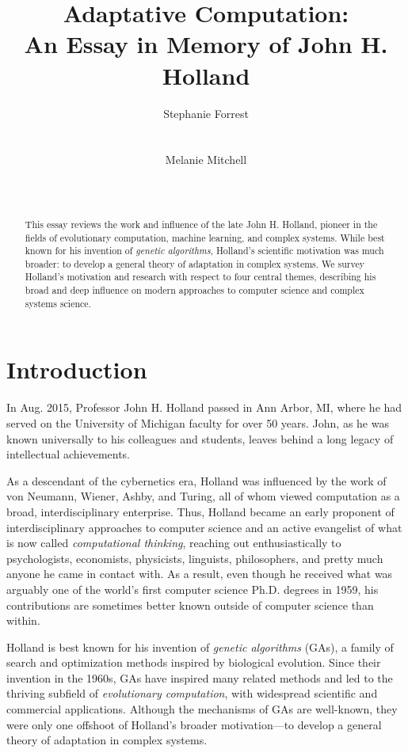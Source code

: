 \documentclass{sig-alternate}
\title{Adaptative Computation:\\ An Essay in Memory of John
  H. Holland}
\author 
{\alignauthor
 Stephanie Forrest\\
 \affaddr{University of New Mexico}\\
 \affaddr{Santa Fe Institute}\\
 \email{forrest@cs.unm.edu}
 \alignauthor
Melanie Mitchell \\
 \affaddr{Portland State University}\\
 \affaddr{Santa Fe Institute}\\
 \email{mm@pdx.edu}
}
\begin{document}
\maketitle

\begin{abstract}
This essay reviews the work and influence of the late John H. Holland,
pioneer in the fields of evolutionary computation, machine learning,
and complex systems.  While best known for his invention of
\emph{genetic algorithms}, Holland's scientific motivation was much
broader:  to develop a general theory of adaptation in complex
systems.  We survey Holland's motivation and research with respect to
four central themes, describing his broad and deep influence on modern approaches to computer science and complex systems science.  
\end{abstract}

\section{Introduction}

In Aug. 2015, Professor John H. Holland passed in Ann Arbor, MI, where
he had served on the University of Michigan faculty for over 50 years.
John, as he was known universally to his colleagues and students,
leaves behind a long legacy of intellectual achievements.

As a descendant of the cybernetics era, Holland was 
influenced by the work of von Neumann, Wiener, Ashby, and Turing, all
of whom viewed computation as a broad, interdisciplinary enterprise.
Thus, Holland became an early proponent of interdisciplinary
approaches to computer science and an active evangelist of what is now
called \emph{computational thinking}, reaching out enthusiastically to
psychologists, economists, physicists, linguists, philosophers, and
pretty much anyone he came in contact with.  As a result, even though
he received what was arguably one of the world's first computer
science
Ph.D. degrees in 1959\cite{London2003}, his contributions are sometimes better known outside of
computer science than within.

Holland is best known for his invention of \emph{genetic
  algorithms} (GAs), a family of search and optimization methods inspired
by biological evolution.  Since their invention in the 1960s, GAs have
inspired many related methods and led to the thriving subfield of
\emph{evolutionary computation}, with widespread scientific and
commercial applications.  Although the mechanisms of GAs are well-known,
they were only one
offshoot of Holland's broader motivation---to develop a general
theory of adaptation in complex systems.  
\end{document}

